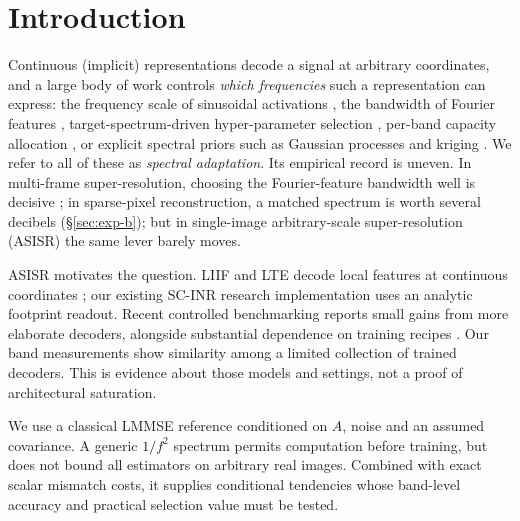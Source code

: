 \section{Introduction}\label{sec:intro}

Continuous (implicit) representations decode a signal at arbitrary
coordinates, and a large body of work controls \emph{which frequencies} such a
representation can express: the frequency scale of sinusoidal activations
\citep{sitzmann2020siren,liu2024finer}, the bandwidth of Fourier features
\citep{tancik2020fourier}, target-spectrum-driven hyper-parameter selection
\citep{kania2025fresh,winner2025,sec2026}, per-band capacity allocation
\citep{wieninr}, or explicit spectral priors such as Gaussian processes and
kriging \citep{rasmussen2006gp}. We refer to all of these as \emph{spectral
adaptation}. Its empirical record is uneven. In multi-frame
super-resolution, choosing the Fourier-feature bandwidth well is decisive
\citep{superf2026}; in sparse-pixel reconstruction, a matched spectrum is
worth several decibels (\S\ref{sec:exp-b}); but in single-image
arbitrary-scale super-resolution (ASISR) the same lever barely moves.

ASISR motivates the question. LIIF and LTE decode local features at
continuous coordinates \citep{chen2021liif,lee2022lte}; our existing SC-INR
research implementation uses an analytic footprint readout. Recent
controlled benchmarking reports small gains from more elaborate decoders,
alongside substantial dependence on training recipes
\citep{nasir2026empirical}. Our band measurements show similarity among a
limited collection of trained decoders. This is evidence about those
models and settings, not a proof of architectural saturation.

We use a classical LMMSE reference conditioned on $A$, noise and an assumed
covariance. A generic $1/f^2$ spectrum permits computation before training,
but does not bound all estimators on arbitrary real images. Combined with
exact scalar mismatch costs, it supplies conditional tendencies whose
band-level accuracy and practical selection value must be tested.

